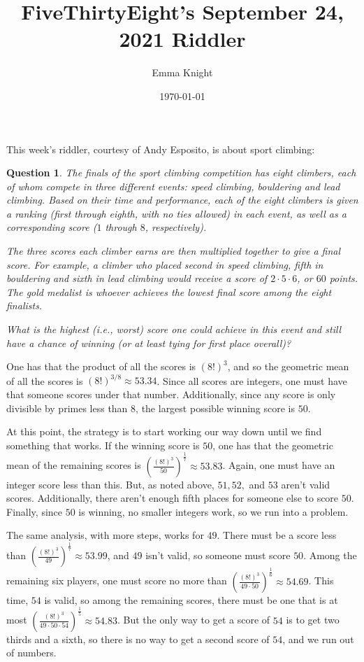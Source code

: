 \documentclass[11pt]{article}
\title{FiveThirtyEight's September 24, 2021 Riddler}
\author{Emma Knight}
\date{\today}
\newtheorem{question}[theorem]{Question}
\theoremstyle{definition}
\begin{document}
\maketitle
This week's riddler, courtesy of Andy Esposito, is about sport climbing:
\begin{question}
The finals of the sport climbing competition has eight climbers, each of whom compete in three different events: speed climbing, bouldering and lead climbing. Based on their time and performance, each of the eight climbers is given a ranking (first through eighth, with no ties allowed) in each event, as well as a corresponding score ($1$ through $8$, respectively).

The three scores each climber earns are then multiplied together to give a final score. For example, a climber who placed second in speed climbing, fifth in bouldering and sixth in lead climbing would receive a score of $2\cdot5\cdot6$, or $60$ points. The gold medalist is whoever achieves the lowest final score among the eight finalists.

What is the highest (i.e., worst) score one could achieve in this event and still have a chance of winning (or at least tying for first place overall)?
\end{question}
One has that the product of all the scores is $(8!)^3$, and so the geometric mean of all the scores is $(8!)^{3/8} \approx 53.34$.  Since all scores are integers, one must have that someone scores under that number.  Additionally, since any score is only divisible by primes less than $8$, the largest possible winning score is $50$.

At this point, the strategy is to start working our way down until we find something that works.  If the winning score is $50$, one has that the geometric mean of the remaining scores is $\displaystyle{\left(\frac{(8!)^3}{50}\right)^{\frac{1}{7}}} \approx 53.83$.  Again, one must have an integer score less than this.  But, as noted above, $51, 52,$ and $53$ aren't valid scores.  Additionally, there aren't enough fifth places for someone else to score $50$.  Finally, since $50$ is winning, no smaller integers work, so we run into a problem.

The same analysis, with more steps, works for $49$.  There must be a score less than $\displaystyle{\left(\frac{(8!)^3}{49}\right)^{\frac{1}{7}}} \approx 53.99$, and $49$ isn't valid, so someone must score $50$.  Among the remaining six players, one must score no more than $\displaystyle{\left(\frac{(8!)^3}{49\cdot50}\right)^{\frac{1}{6}}} \approx 54.69$.  This time, $54$ is valid, so among the remaining scores, there must be one that is at most $\displaystyle{\left(\frac{(8!)^3}{49 \cdot 50\cdot 54}\right)^{\frac{1}{5}}} \approx 54.83$.  But the only way to get a score of $54$ is to get two thirds and a sixth, so there is no way to get a second score of $54$, and we run out of numbers.
\end{document}
